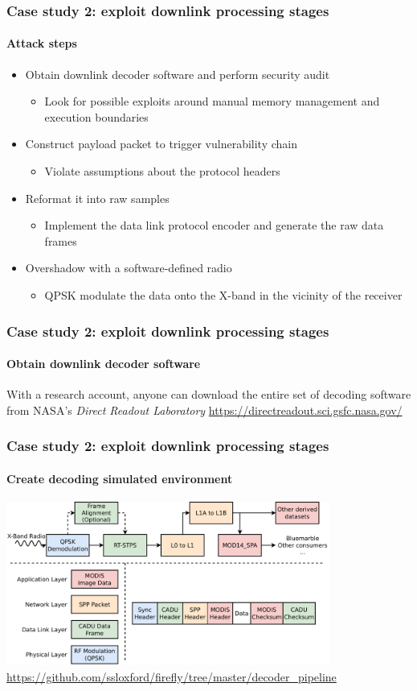 \documentclass{beamer}
\begin{document}
\begin{frame}
  \frametitle{Case study 2: exploit downlink processing stages}
  \framesubtitle{Attack steps}
  \begin{itemize}
   \item Obtain downlink decoder software and perform security audit
   \begin{itemize}
     \item Look for possible exploits around manual memory management and execution boundaries
   \end{itemize}

    \item Construct payload packet to trigger vulnerability chain
    \begin{itemize}
      \item Violate assumptions about the protocol headers
    \end{itemize}

    \item Reformat it into raw samples
    \begin{itemize}
      \item Implement the data link protocol encoder and generate the raw data frames
    \end{itemize}

    \item Overshadow with a software-defined radio
    \begin{itemize}
      \item QPSK modulate the data onto the X-band in the vicinity of the receiver
    \end{itemize}
  \end{itemize}
\end{frame}

\begin{frame}
  \frametitle{Case study 2: exploit downlink processing stages}
  \framesubtitle{Obtain downlink decoder software}
  With a research account, anyone can download the entire set of decoding software from NASA's \textit{Direct Readout Laboratory}
  \url{https://directreadout.sci.gsfc.nasa.gov/}
\end{frame}

\begin{frame}
  \frametitle{Case study 2: exploit downlink processing stages}
  \framesubtitle{Create decoding simulated environment}
  \centering
  \includegraphics[width=0.8\textwidth]{images/attack_types.pdf}
  \url{https://github.com/ssloxford/firefly/tree/master/decoder_pipeline}
\end{frame}
\end{document}
